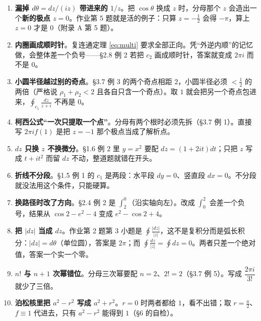 \documentclass[11pt]{ctexart}
\begin{document}
\begin{enumerate}[label=\textbf{\arabic*.}]
\item \textbf{漏掉 $d\theta=dz/(iz)$ 带进来的 $1/z$}。把 $\cos\theta$ 换成 $z$ 时，分母那个 $z$ 会造出一个\textbf{新的极点 $z=0$}。作业第 5 题就是活的例子：只算 $z=-\tfrac12$ 会得 $-\pi$，算上 $z=0$ 才是 $0$（附录 A 第 5 题）。

\item \textbf{内圈画成顺时针}。复连通定理 \eqref{eq:multi} 要求全部正向。凭“外逆内顺”的记忆做，会整体差一个负号——§2.8 例 2 若把 $c_2$ 画成顺时针，答案就变成 $2\pi i$ 而不是 $0$。

\item \textbf{小圆半径越过别的奇点}。§3.7 例 3 的两个奇点相距 $2$，小圆半径必须 $<\tfrac12$ 的两倍（严格说 $\rho_1+\rho_2<2$ 且各自只含一个奇点）。取 $1$ 就会把另一个奇点包进来，$\oint_{c_1}\frac{dz}{z+i}$ 不再是 $0$。

\item \textbf{柯西公式“一次只提取一个点”}。分母有两个根时必须先拆（§3.7 例 1）。直接写 $2\pi i f(1)$ 是把 $z=-1$ 那个极点当成了解析点。

\item \textbf{$dz$ 只换 $z$ 不换微分}。§1.6 例 2 里 $y=x^{2}$ 要配 $dz=(1+2it)dt$；只把 $z$ 写成 $t+it^{2}$ 而留 $dz$ 不动，整道题就错在开头。

\item \textbf{折线不分段}。§1.5 例 1 的 $c_1$ 是两段：水平段 $dy=0$、竖直段 $dx=0$。不分段就没法用这个条件，只能硬算。

\item \textbf{换路径时改了方向}。§2.4 例 2 是 $\int_2^0$（沿实轴向左）。改成 $\int_0^2$ 会差一个负号，结果从 $\cos2-e^{2}-4$ 变成 $e^{2}-\cos2+4$。

\item \textbf{把 $|dz|$ 当成 $dz$}。作业第 2 题第 3 小题是 $\oint\frac{|dz|}{|z|}$，这不是复积分而是弧长积分：$|dz|=d\theta$（单位圆），答案是 $2\pi$；而 $\oint\frac{dz}{|z|}=\oint dz=0$。两者只差一个绝对值，答案一个实一个零。

\item \textbf{$n!$ 与 $n+1$ 次幂错位}。分母三次幂要配 $n=2$、$2!=2$（§3.7 例 5）。写成 $\dfrac{2\pi i}{3!}$ 就少了三倍。

\item \textbf{泊松核里把 $a^{2}-r^{2}$ 写成 $a^{2}+r^{2}$}。$r=0$ 时两者都给 $1$，看不出错；取 $r=\tfrac{a}{2}$、$f\equiv1$ 代进去，只有 $a^{2}-r^{2}$ 能得到 $1$（§6 的自检）。
\end{enumerate}
\end{document}
